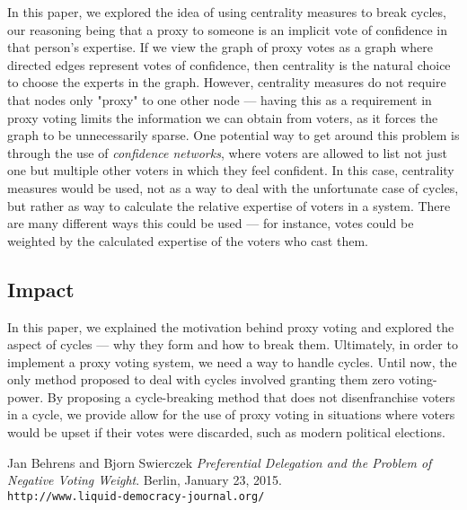 \documentclass[10pt]{article}
\begin{document}
In this paper, we explored the idea of using centrality measures to break cycles, our reasoning being that a proxy to someone is an implicit vote of confidence in that person's expertise. If we view the graph of proxy votes as a graph where directed edges represent votes of confidence, then centrality is the natural choice to choose the experts in the graph. However, centrality measures do not require that nodes only "proxy" to one other node --- having this as a requirement in proxy voting limits the information we can obtain from voters, as it forces the graph to be unnecessarily sparse. One potential way to get around this problem is through the use of \textit{confidence networks}, where voters are allowed to list not just one but multiple other voters in which they feel confident. In this case, centrality measures would be used, not as a way to deal with the unfortunate case of cycles, but rather as way to calculate the relative expertise of voters in a system. There are many different ways this could be used --- for instance, votes could be weighted by the calculated expertise of the voters who cast them.

\subsection{Impact}
In this paper, we explained the motivation behind proxy voting and explored the aspect of cycles --- why they form and how to break them. Ultimately, in order to implement a proxy voting system, we need a way to handle cycles. Until now, the only method proposed to deal with cycles involved granting them zero voting-power. By proposing a cycle-breaking method that does not disenfranchise voters in a cycle, we provide allow for the use of proxy voting in situations where voters would be upset if their votes were discarded, such as modern political elections.

\begin{thebibliography}{9}
Jan Behrens and Bjorn Swierczek
\textit{Preferential Delegation and the Problem of Negative Voting Weight}. 
Berlin, January 23, 2015.
\\\texttt{http://www.liquid-democracy-journal.org/}

\end{thebibliography}
\end{document}
